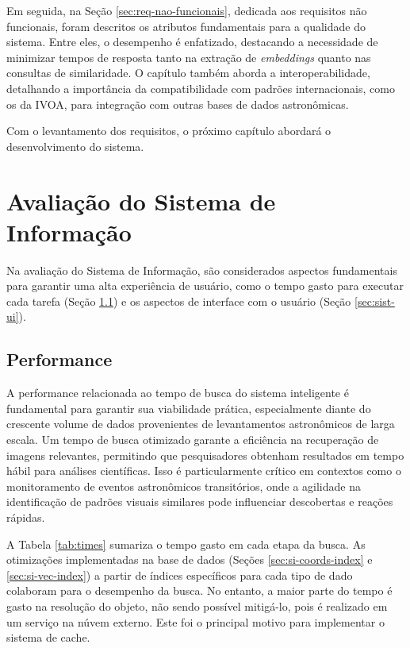Em seguida, na Seção \ref{sec:req-nao-funcionais}, dedicada aos requisitos não funcionais, foram descritos os atributos fundamentais para a qualidade do sistema. Entre eles, o desempenho é enfatizado, destacando a necessidade de minimizar tempos de resposta tanto na extração de \emph{embeddings} quanto nas consultas de similaridade.  O capítulo também aborda a interoperabilidade, detalhando a importância da compatibilidade com padrões internacionais, como os da IVOA, para integração com outras bases de dados astronômicas.

Com o levantamento dos requisitos, o próximo capítulo abordará o desenvolvimento do sistema.









\section{Avaliação do Sistema de Informação}
\label{sec:res-sist}

Na avaliação do Sistema de Informação, são considerados aspectos fundamentais para garantir uma alta experiência de usuário, como o tempo gasto para executar cada tarefa (Seção \ref{sec:sist-performance}) e os aspectos de interface com o usuário (Seção \ref{sec:sist-ui}).


\subsection{Performance}
\label{sec:sist-performance}

A performance relacionada ao tempo de busca do sistema inteligente é fundamental para garantir sua viabilidade prática, especialmente diante do crescente volume de dados provenientes de levantamentos astronômicos de larga escala. Um tempo de busca otimizado garante a eficiência na recuperação de imagens relevantes, permitindo que pesquisadores obtenham resultados em tempo hábil para análises científicas. Isso é particularmente crítico em contextos como o monitoramento de eventos astronômicos transitórios, onde a agilidade na identificação de padrões visuais similares pode influenciar descobertas e reações rápidas.

A Tabela \ref{tab:times} sumariza o tempo gasto em cada etapa da busca. As otimizações implementadas na base de dados (Seções \ref{sec:si-coords-index} e \ref{sec:si-vec-index}) a partir de índices específicos para cada tipo de dado colaboram para o desempenho da busca. No entanto, a maior parte do tempo é gasto na resolução do objeto, não sendo possível mitigá-lo, pois é realizado em um serviço na núvem externo. Este foi o principal motivo para implementar o sistema de cache.

